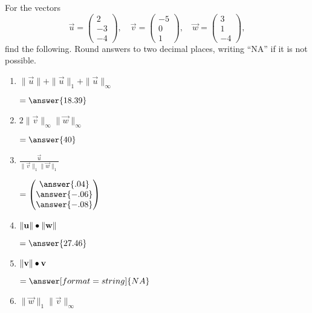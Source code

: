 \documentclass{ximera}
\author{Parisa Fatheddin}
\begin{document}
\begin{exercise}
  For the vectors
  \[
    \vec{u} = \begin{pmatrix} 2\\ -3\\ -4 \end{pmatrix}, \quad
    \vec{v} = \begin{pmatrix} -5\\ 0\\ 1 \end{pmatrix}, \quad
    \vec{w} = \begin{pmatrix} 3 \\ 1 \\ -4 \end{pmatrix},
  \]
  find the following. Round answers to two decimal places, writing
  ``NA'' if it is not possible.
  \begin{enumerate}
    \item $\|\vec{u}\| + \|\vec{u}\|_{1} + \|\vec{u}\|_{\infty}$
      \begin{prompt}
        $=\answer{18.39}$
      \end{prompt}
    \item $2 \|\vec{v}\|_{\infty} \|\vec{w}\|_{\infty}$
      \begin{prompt}
        $=\answer{40}$
      \end{prompt}
    \item $\frac{\vec{u}}{\|\vec{v}\|_{1} \|\vec{w}\|_{1}}$
      \begin{prompt}
        $=\begin{pmatrix}
          \answer{.04} \\
          \answer{-.06} \\
          \answer{-.08}
        \end{pmatrix}$
      \end{prompt}
    \item $\|\mathbf{u}\| \bullet \|\mathbf{w}\|$ %
      \begin{prompt}
        $=\answer{27.46}$
      \end{prompt}
    \item $\|\mathbf{v}\| \bullet \mathbf{v}$
      \begin{prompt}
        $=\answer[format=string]{NA}$
      \end{prompt}
    \item $\|\vec{w}\|_{1} \|\vec{v}\|_{\infty}$
      \begin{prompt}

\end{prompt}
\end{enumerate}
\end{exercise}
\end{document}
